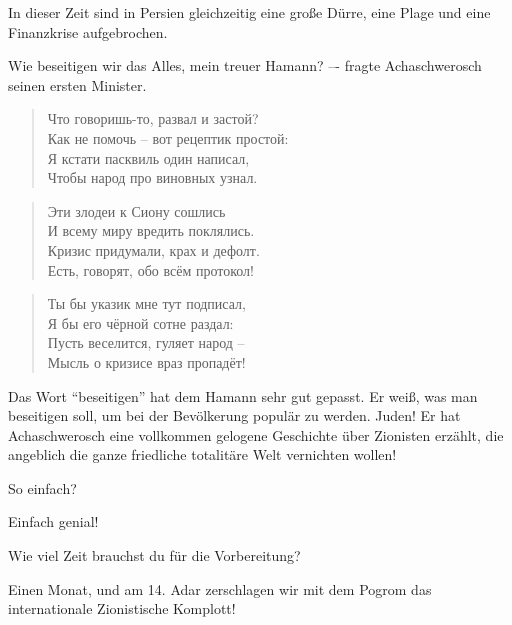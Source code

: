 \documentclass[12pt,a4paper,titlepage]{article}
\begin{document}
\begin{drama}
\uespeaks
In dieser Zeit sind in Persien gleichzeitig eine große Dürre,
eine Plage und eine Finanzkrise aufgebrochen.

Wie beseitigen wir das Alles, mein treuer Hamann?
–- fragte Achaschwerosch seinen ersten Minister.

\amspeaks {}
\begin{verse}
Что говоришь-то, развал и застой?\\
Как не помочь -- вот рецептик простой:\\
Я кстати пасквиль один написал,\\
Чтобы народ про виновных узнал.\\
\end{verse}

\begin{verse}
Эти злодеи к Сиону сошлись\\
И всему миру вредить поклялись.\\
Кризис придумали, крах и дефолт.\\
Есть, говорят, обо всём протокол!\\
\end{verse}

\begin{verse}
Ты бы указик мне тут подписал,\\
Я бы его чёрной сотне раздал:\\
Пусть веселится, гуляет народ --\\
Мысль о кризисе враз пропадёт!\\
\end{verse}


\uespeaks
Das Wort "`beseitigen"' hat dem Hamann sehr gut gepasst. Er weiß,
was man beseitigen soll, um bei der Bevölkerung populär zu werden.
Juden! Er hat Achaschwerosch eine vollkommen gelogene Geschichte
über Zionisten erzählt, die angeblich die ganze friedliche totalitäre Welt
vernichten wollen!

\ahspeaks
So einfach?

\amspeaks
Einfach genial! 

\ahspeaks
Wie viel Zeit brauchst du für die Vorbereitung?

\amspeaks
Einen Monat, und am 14. Adar zerschlagen wir mit dem Pogrom
das internationale Zionistische Komplott!



\end{drama}
\end{document}
